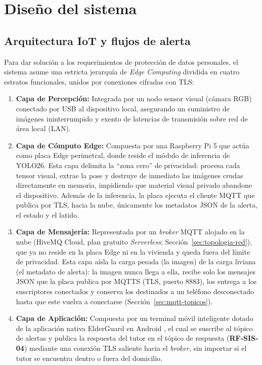 \documentclass[12pt,a4paper,oneside]{book}
\theoremstyle{plain}
\theoremstyle{definition}
\theoremstyle{remark}
\begin{document}
\chapter{Diseño del sistema}
\label{cap:diseno}

\section{Arquitectura IoT y flujos de alerta}
\label{sec:arquitectura-iot}

Para dar solución a los requerimientos de protección de datos personales, el sistema asume una estricta jerarquía de \textit{Edge Computing} dividida en cuatro estratos funcionales, unidos por conexiones cifradas con TLS:

\begin{enumerate}
    \item \textbf{Capa de Percepción:} Integrada por un nodo sensor visual (cámara RGB) conectado por USB al dispositivo local, asegurando un suministro de imágenes ininterrumpido y exento de latencias de transmisión sobre red de área local (LAN).
    \item \textbf{Capa de Cómputo Edge:} Compuesta por una Raspberry Pi 5 que actúa como placa Edge perimetral, donde reside el módulo de inferencia de YOLO26. Esta capa delimita la \enquote{zona cero} de privacidad: procesa cada tensor visual, extrae la pose y destruye de inmediato las imágenes crudas directamente en memoria, impidiendo que material visual privado abandone el dispositivo. Además de la inferencia, la placa ejecuta el cliente MQTT que publica por TLS, hacia la nube, únicamente los metadatos JSON de la alerta, el estado y el latido.
    \item \textbf{Capa de Mensajería:} Representada por un \textit{broker} MQTT alojado en la nube (HiveMQ Cloud, plan gratuito \textit{Serverless}; Sección~\ref{sec:topologia-red}), que ya no reside en la placa Edge ni en la vivienda y queda fuera del límite de privacidad. Esta capa aísla la carga pesada (la imagen) de la carga liviana (el metadato de alerta): la imagen nunca llega a ella, recibe solo los mensajes JSON que la placa publica por MQTTS (TLS, puerto 8883), los entrega a los suscriptores conectados y conserva los destinados a un teléfono desconectado hasta que este vuelva a conectarse (Sección~\ref{sec:mqtt-topicos}).
    \item \textbf{Capa de Aplicación:} Compuesta por un terminal móvil inteligente dotado de la aplicación nativa ElderGuard en Android \parencite{uv2026desarrollo}, el cual se suscribe al tópico de alertas y publica la respuesta del tutor en el tópico de respuesta (\textbf{RF-SIS-04}) mediante una conexión TLS saliente hacia el \textit{broker}, sin importar si el tutor se encuentra dentro o fuera del domicilio.
\end{enumerate}
\end{document}
